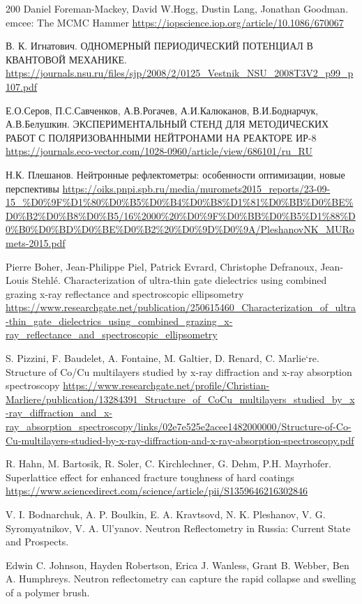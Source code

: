 \documentclass[a4paper]{article}
\begin{document}
\begin{thebibliography}{200}
 Daniel Foreman-Mackey, David W.Hogg, Dustin Lang, Jonathan Goodman. emcee: The MCMC Hammer \url{https://iopscience.iop.org/article/10.1086/670067}

 В. К. Игнатович. ОДНОМЕРНЫЙ ПЕРИОДИЧЕСКИЙ ПОТЕНЦИАЛ В КВАНТОВОЙ МЕХАНИКЕ. \url{https://journals.nsu.ru/files/sjp/2008/2/0125_Vestnik_NSU_2008T3V2_p99_p107.pdf}

 Е.О.Серов, П.С.Савченков, А.В.Рогачев, А.И.Калюканов, В.И.Боднарчук, А.В.Белушкин. ЭКСПЕРИМЕНТАЛЬНЫЙ СТЕНД ДЛЯ МЕТОДИЧЕСКИХ РАБОТ С ПОЛЯРИЗОВАННЫМИ НЕЙТРОНАМИ НА РЕАКТОРЕ ИР-8 \url{https://journals.eco-vector.com/1028-0960/article/view/686101/ru_RU}

 Н.К. Плешанов. Нейтронные рефлектометры:
особенности оптимизации, новые перспективы \url{https://oiks.pnpi.spb.ru/media/muromets2015_reports/23-09-15_%D0%9F%D1%80%D0%B5%D0%B4%D0%B8%D1%81%D0%BB%D0%BE%D0%B2%D0%B8%D0%B5/16%2000%20%D0%9F%D0%BB%D0%B5%D1%88%D0%B0%D0%BD%D0%BE%D0%B2%20%D0%9D%D0%9A/PleshanovNK_MURomets-2015.pdf}  

 Pierre Boher, Jean-Philippe Piel, Patrick Evrard, Christophe Defranoux, Jean-Louis Stehlé. Characterization of ultra-thin gate dielectrics using combined grazing x-ray reflectance and spectroscopic ellipsometry \url{https://www.researchgate.net/publication/250615460_Characterization_of_ultra-thin_gate_dielectrics_using_combined_grazing_x-ray_reflectance_and_spectroscopic_ellipsometry}

 S. Pizzini, F. Baudelet, A. Fontaine, M. Galtier, D. Renard, C. Marlie`re. Structure of Co/Cu multilayers studied by x-ray diffraction and x-ray absorption spectroscopy \url{https://www.researchgate.net/profile/Christian-Marliere/publication/13284391_Structure_of_CoCu_multilayers_studied_by_x-ray_diffraction_and_x-ray_absorption_spectroscopy/links/02e7e525e2acee1482000000/Structure-of-Co-Cu-multilayers-studied-by-x-ray-diffraction-and-x-ray-absorption-spectroscopy.pdf}

 R. Hahn, M. Bartosik, R. Soler, C. Kirchlechner, G. Dehm, P.H. Mayrhofer. Superlattice effect for enhanced fracture toughness of hard coatings \url{https://www.sciencedirect.com/science/article/pii/S1359646216302846}

V. I. Bodnarchuk, A. P. Boulkin, E. A. Kravtsovd, N. K. Pleshanov, V. G. Syromyatnikov, V. A. Ul’yanov. Neutron Reflectometry in Russia: Current State and Prospects.

Edwin C. Johnson, Hayden Robertson, Erica J. Wanless, Grant B. Webber, Ben A. Humphreys. Neutron reflectometry can capture the rapid collapse and swelling of a polymer brush.


\end{thebibliography}
\end{document}
